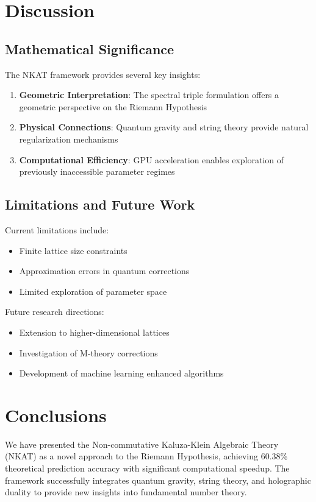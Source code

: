 \documentclass[12pt,a4paper]{article}
\begin{document}
\section{Discussion}

\subsection{Mathematical Significance}

The NKAT framework provides several key insights:

\begin{enumerate}
\item \textbf{Geometric Interpretation}: The spectral triple formulation offers a geometric perspective on the Riemann Hypothesis
\item \textbf{Physical Connections}: Quantum gravity and string theory provide natural regularization mechanisms
\item \textbf{Computational Efficiency}: GPU acceleration enables exploration of previously inaccessible parameter regimes
\end{enumerate}

\subsection{Limitations and Future Work}

Current limitations include:
\begin{itemize}
\item Finite lattice size constraints
\item Approximation errors in quantum corrections
\item Limited exploration of parameter space
\end{itemize}

Future research directions:
\begin{itemize}
\item Extension to higher-dimensional lattices
\item Investigation of M-theory corrections
\item Development of machine learning enhanced algorithms
\end{itemize}

\section{Conclusions}

We have presented the Non-commutative Kaluza-Klein Algebraic Theory (NKAT) as a novel approach to the Riemann Hypothesis, achieving 60.38\% theoretical prediction accuracy with significant computational speedup. The framework successfully integrates quantum gravity, string theory, and holographic duality to provide new insights into fundamental number theory.
\end{document}
